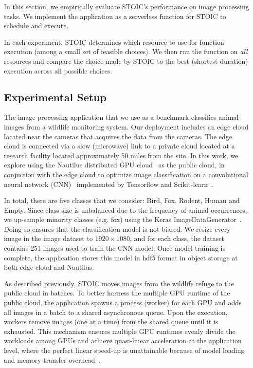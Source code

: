 In this section, we empirically evaluate STOIC's performance on image
processing tasks. We implement the application as a serverless function for
STOIC to schedule and execute.

In each experiment, STOIC determines which resource to
use for function execution (among a small set of feasible choices). We then
run the function on \textit{all} resources and compare the choice made by
STOIC to the best (shortest duration) execution across all possible choices.

\subsection{Experimental Setup}

The image processing application that we use as a benchmark classifies animal
images from a wildlife monitoring system.
Our deployment includes an edge cloud located near the cameras that acquires
the data from the cameras. The edge cloud is connected via a slow (microwave)
link to a private cloud located at a research facility located
approximately 50 miles from the site.
In this work, we explore using the Nautilus distributed GPU
cloud~\cite{ref:nautilus} as the public cloud,
in conjuction with the edge cloud to optimize image
classification on a convolutional neural network (CNN)~\cite{ref:cnn}
implemented by Tensorflow and Scikit-learn~\cite{ref:scikit}. 

In total, there are five classes that we consider: Bird, Fox, Rodent, Human
and Empty. Since class size is unbalanced due to the frequency of animal
occurrences, we up-sample minority classes (e.g. fox) using the Keras
ImageDataGenerator~\cite{ref:keras}. Doing so ensures that the classification
model is not biased. We resize every image in the image dataset to $1920 \times
1080$, and for each class, the dataset contains 251 images used to train the
CNN model. Once model training is complete, the application stores this model
in hdf5 format in object storage at both edge cloud and Nautilus.

As described previously, STOIC moves images from the wildlife refuge
to the public cloud in batches.
To better harness the multiple GPU runtime of the public cloud,
the application spawns a process (wor\-ker) for each GPU and adds all images in
a batch to a shared asynchronous queue. Upon the execution, workers remove
images (one at a time) from the shared queue until it is exhausted. This
mechanism ensures multiple GPU runtimes evenly divide the workloads among
GPUs and achieve
quasi-linear acceleration at the application level, where the perfect linear
speed-up is unattainable because of model loading and memory transfer
overhead~\cite{ref:multi_gpu}. 


